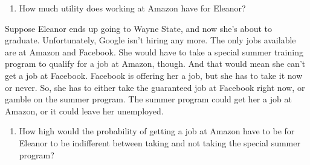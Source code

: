 \documentclass[
  11pt,
]{article}
\providecommand{\tightlist}{%
  \setlength{\itemsep}{0pt}\setlength{\parskip}{0pt}}
\begin{document}
\begin{enumerate}
\def\labelenumi{\arabic{enumi}.}
\setcounter{enumi}{5}
\tightlist
\item
  How much utility does working at Amazon have for Eleanor?
\end{enumerate}

Suppose Eleanor ends up going to Wayne State, and now she's about to
graduate. Unfortunately, Google isn't hiring any more. The only jobs
available are at Amazon and Facebook. She would have to take a special
summer training program to qualify for a job at Amazon, though. And that
would mean she can't get a job at Facebook. Facebook is offering her a
job, but she has to take it now or never. So, she has to either take the
guaranteed job at Facebook right now, or gamble on the summer program.
The summer program could get her a job at Amazon, or it could leave her
unemployed.

\begin{enumerate}
\def\labelenumi{\arabic{enumi}.}
\setcounter{enumi}{6}
\tightlist
\item
  How high would the probability of getting a job at Amazon have to be
  for Eleanor to be indifferent between taking and not taking the
  special summer program?
\end{enumerate}
\end{document}
